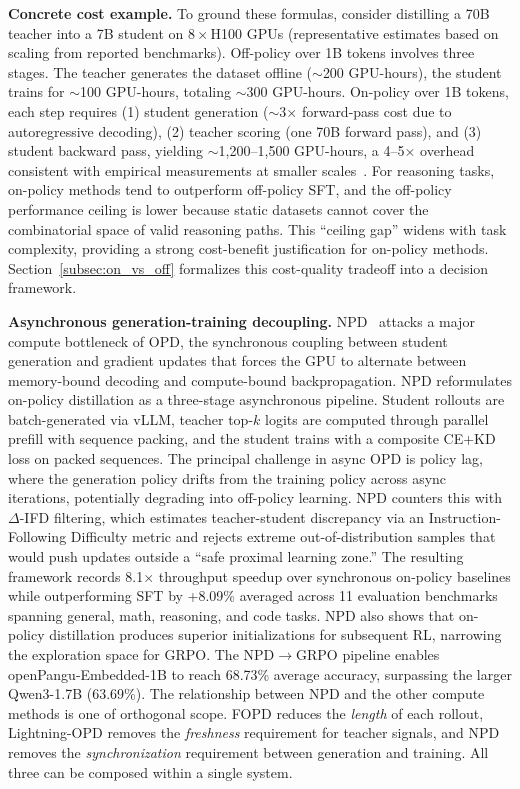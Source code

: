 \documentclass{article} %
\begin{document}
\textbf{Concrete cost example.} To ground these formulas, consider distilling a 70B teacher into a 7B student on $8\times$H100 GPUs (representative estimates based on scaling from reported benchmarks). Off-policy over 1B tokens involves three stages. The teacher generates the dataset offline ($\sim$200 GPU-hours), the student trains for $\sim$100 GPU-hours, totaling $\sim$300 GPU-hours. On-policy over 1B tokens, each step requires (1) student generation ($\sim$3$\times$ forward-pass cost due to autoregressive decoding), (2) teacher scoring (one 70B forward pass), and (3) student backward pass, yielding $\sim$1,200--1,500 GPU-hours, a 4--5$\times$ overhead consistent with empirical measurements at smaller scales~\citep{2604.13010}. For reasoning tasks, on-policy methods tend to outperform off-policy SFT, and the off-policy performance ceiling is lower because static datasets cannot cover the combinatorial space of valid reasoning paths. This ``ceiling gap'' widens with task complexity, providing a strong cost-benefit justification for on-policy methods. Section~\ref{subsec:on_vs_off} formalizes this cost-quality tradeoff into a decision framework.

\textbf{Asynchronous generation-training decoupling.} NPD~\citep{2605.05940} attacks a major compute bottleneck of OPD, the synchronous coupling between student generation and gradient updates that forces the GPU to alternate between memory-bound decoding and compute-bound backpropagation. NPD reformulates on-policy distillation as a three-stage asynchronous pipeline. Student rollouts are batch-generated via vLLM, teacher top-$k$ logits are computed through parallel prefill with sequence packing, and the student trains with a composite CE+KD loss on packed sequences. The principal challenge in async OPD is policy lag, where the generation policy drifts from the training policy across async iterations, potentially degrading into off-policy learning. NPD counters this with $\Delta$-IFD filtering, which estimates teacher-student discrepancy via an Instruction-Following Difficulty metric and rejects extreme out-of-distribution samples that would push updates outside a ``safe proximal learning zone.'' The resulting framework records 8.1$\times$ throughput speedup over synchronous on-policy baselines while outperforming SFT by +8.09\% averaged across 11 evaluation benchmarks spanning general, math, reasoning, and code tasks. NPD also shows that on-policy distillation produces superior initializations for subsequent RL, narrowing the exploration space for GRPO. The NPD$\to$GRPO pipeline enables openPangu-Embedded-1B to reach 68.73\% average accuracy, surpassing the larger Qwen3-1.7B (63.69\%). The relationship between NPD and the other compute methods is one of orthogonal scope. FOPD reduces the \emph{length} of each rollout, Lightning-OPD removes the \emph{freshness} requirement for teacher signals, and NPD removes the \emph{synchronization} requirement between generation and training. All three can be composed within a single system.
\end{document}
